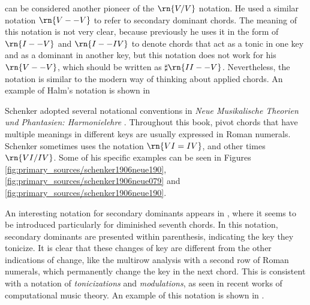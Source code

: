 \textcite{halm1900harmonielehre} can be considered another
pioneer of the $\rn{V/V}$ notation. He used a similar
notation $\rn{V--V}$ to refer to secondary dominant chords.
The meaning of this notation is not very clear, because
previously he uses it in the form of $\rn{I--V}$ and
$\rn{I--IV}$ to denote chords that act as a tonic in one key
and as a dominant in another key, but this notation does not
work for his $\rn{V--V}$, which should be written as
$\sharp{}\rn{II--V}$. Nevertheless, the notation is similar
to the modern way of thinking about applied chords. An
example of Halm's notation is shown in


Schenker adopted several notational conventions in
\emph{Neue Musikalische Theorien und Phantasien:
Harmonielehre} \parencite{schenker1906neue}. Throughout this
book, pivot chords that have multiple meanings in different
keys are usually expressed in Roman numerals. Schenker
sometimes uses the notation $\rn{VI=IV}$, and other times
$\rn{VI/IV}$. Some of his specific examples can be seen in
Figures \ref{fig:primary_sources/schenker1906neue190},
\ref{fig:primary_sources/schenker1906neue079} and
\ref{fig:primary_sources/schenker1906neue190}.




An interesting notation for secondary dominants appears in
\textcite{white1911harmonic}, where it seems to be
introduced particularly for diminished seventh chords. In
this notation, secondary dominants are presented within
parenthesis, indicating the key they tonicize. It is clear
that these changes of key are different from the other
indications of change, like the multirow analysis with a
second row of Roman numerals, which permanently change the
key in the next chord. This is consistent with a notation of
\emph{tonicizations} and \emph{modulations}, as seen in
recent works of computational music theory. An example of
this notation is shown in
.


